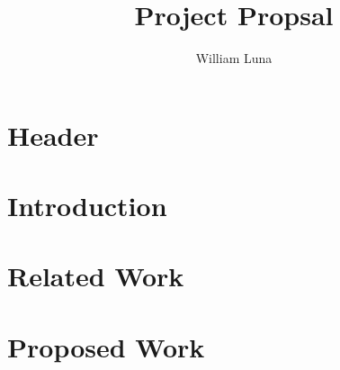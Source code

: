 \documentclass[
	letterpaper, %
]{jdf}
\author{William Luna}
\title{Project Propsal}
\begin{document}

\maketitle
\section{Header}


\section{Introduction}


\section{Related Work}


\section{Proposed Work}
\end{document}
